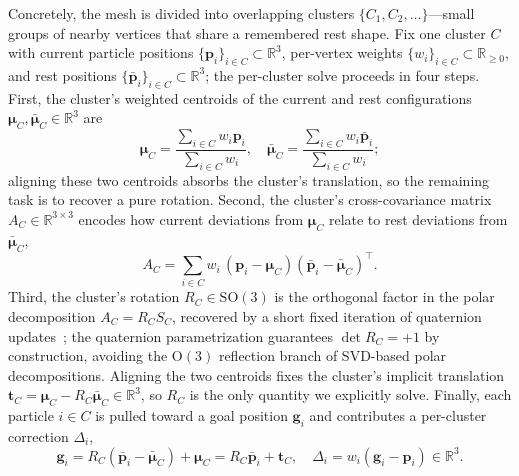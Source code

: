 \documentclass[letterpaper, 10 pt, conference]{ieeeconf}  %
\theoremstyle{tight}
\begin{document}
Concretely, the mesh is divided into overlapping clusters
$\{C_1, C_2, \ldots\}$---small groups of nearby vertices that share a
remembered rest shape. Fix one cluster $C$ with current particle
positions $\{\mathbf{p}_i\}_{i \in C} \subset \mathbb{R}^3$, per-vertex
weights $\{w_i\}_{i \in C} \subset \mathbb{R}_{\geq 0}$, and rest
positions $\{\bar{\mathbf{p}}_i\}_{i \in C} \subset \mathbb{R}^3$; the
per-cluster solve proceeds in four steps. First, the cluster's weighted
centroids of the current and rest configurations
$\boldsymbol{\mu}_C, \bar{\boldsymbol{\mu}}_C \in \mathbb{R}^3$ are
\begin{equation}
  \boldsymbol{\mu}_C \!=\!
    \frac{\sum_{i \in C} w_i \mathbf{p}_i}{\sum_{i \in C} w_i},
  \quad
  \bar{\boldsymbol{\mu}}_C \!=\!
    \frac{\sum_{i \in C} w_i \bar{\mathbf{p}}_i}{\sum_{i \in C} w_i};
  \label{eq:centroid}
\end{equation}
aligning these two centroids absorbs the cluster's translation, so the
remaining task is to recover a pure rotation. Second, the cluster's
cross-covariance matrix $A_C \in \mathbb{R}^{3 \times 3}$ encodes how
current deviations from $\boldsymbol{\mu}_C$ relate to rest deviations
from $\bar{\boldsymbol{\mu}}_C$,
\begin{equation}
  A_C = \sum_{i \in C} w_i\,(\mathbf{p}_i - \boldsymbol{\mu}_C)
                            (\bar{\mathbf{p}}_i - \bar{\boldsymbol{\mu}}_C)^\top.
  \label{eq:covariance}
\end{equation}
Third, the cluster's rotation $R_C \in \mathrm{SO}(3)$ is the orthogonal
factor in the polar decomposition $A_C = R_C S_C$, recovered by a short
fixed iteration of quaternion updates~\cite{muller2016}; the
quaternion parametrization guarantees $\det R_C = +1$ by
construction, avoiding the $\mathrm{O}(3)$ reflection branch of
SVD-based polar decompositions. Aligning the
two centroids fixes the cluster's implicit translation
$\mathbf{t}_C \!=\! \boldsymbol{\mu}_C - R_C \bar{\boldsymbol{\mu}}_C
\in \mathbb{R}^3$, so $R_C$ is the only quantity we explicitly solve.
Finally, each particle $i \in C$ is pulled toward a goal position
$\mathbf{g}_i$ and contributes a per-cluster correction $\Delta_i$,
\begin{equation}
  \mathbf{g}_i \!=\! R_C(\bar{\mathbf{p}}_i - \bar{\boldsymbol{\mu}}_C)
                       + \boldsymbol{\mu}_C
                \!=\! R_C \bar{\mathbf{p}}_i + \mathbf{t}_C,
  \quad
  \Delta_i \!=\! w_i (\mathbf{g}_i - \mathbf{p}_i)
            \in \mathbb{R}^3.
  \label{eq:cluster-correction}
\end{equation}
\end{document}

